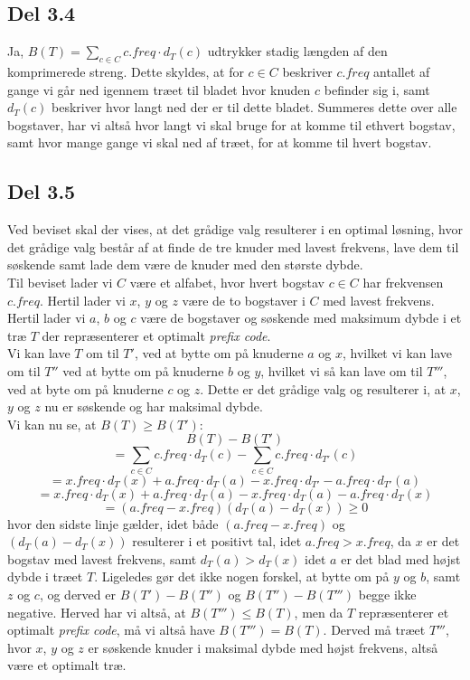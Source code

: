 \documentclass{report}
\begin{document}
\newpage

\subsection*{Del 3.4}
Ja, $B(T) = \sum_{c \in C} c.freq \cdot d_T(c)$ udtrykker stadig længden af den komprimerede streng. Dette skyldes, at for $c \in C$ beskriver $c.freq$ antallet af gange vi går ned igennem træet til bladet hvor knuden $c$ befinder sig i, samt $d_T(c)$ beskriver hvor langt ned der er til dette bladet. Summeres dette over alle bogstaver, har vi altså hvor langt vi skal bruge for at komme til ethvert bogstav, samt hvor mange gange vi skal ned af træet, for at komme til hvert bogstav.

\newpage

\subsection*{Del 3.5}
Ved beviset skal der vises, at det grådige valg resulterer i en optimal løsning, hvor det grådige valg består af at finde de tre knuder med lavest frekvens, lave dem til søskende samt lade dem være de knuder med den største dybde. \\
Til beviset lader vi $C$ være et alfabet, hvor hvert bogstav $c \in C$ har frekvensen $c.freq$. Hertil lader vi $x$, $y$ og $z$ være de to bogstaver i $C$ med lavest frekvens. Hertil lader vi $a$, $b$ og $c$ være de bogstaver og søskende med maksimum dybde i et træ $T$ der repræsenterer et optimalt \textit{prefix code}. \\
Vi kan lave $T$ om til $T'$, ved at bytte om på knuderne $a$ og $x$, hvilket vi kan lave om til $T''$ ved at bytte om på knuderne $b$ og $y$, hvilket vi så kan lave om til $T'''$, ved at byte om på knuderne $c$ og $z$. Dette er det grådige valg og resulterer i, at $x$, $y$ og $z$ nu er søskende og har maksimal dybde. \\
Vi kan nu se, at $B(T) \geq B(T')$:
$$B(T) - B(T')$$
$$= \sum_{c \in C} c.freq \cdot d_T(c) - \sum_{c \in C} c.freq \cdot d_{T'} (c)$$
$$= x.freq \cdot d_T(x) + a.freq \cdot d_T(a) - x.freq \cdot d_{T'} - a.freq \cdot d_{T'}(a)$$
$$= x.freq \cdot d_T(x) + a.freq \cdot d_T(a) - x.freq \cdot d_T(a) - a.freq \cdot d_T(x)$$
$$= (a.freq - x.freq)(d_T(a) - d_T(x)) \geq 0$$
hvor den sidste linje gælder, idet både $(a.freq - x.freq)$ og $(d_T(a) - d_T(x))$ resulterer i et positivt tal, idet $a.freq > x.freq$, da $x$ er det bogstav med lavest frekvens, samt $d_T(a) > d_T(x)$ idet $a$ er det blad med højst dybde i træet $T$. Ligeledes gør det ikke nogen forskel, at bytte om på $y$ og $b$, samt $z$ og $c$, og derved er $B(T') - B(T'')$ og $B(T'') - B(T''')$ begge ikke negative. Herved har vi altså, at $B(T''') \leq B(T)$, men da $T$ repræsenterer et optimalt \textit{prefix code}, må vi altså have $B(T''') = B(T)$. Derved må træet $T'''$, hvor $x$, $y$ og $z$ er søskende knuder i maksimal dybde med højst frekvens, altså være et optimalt træ.
\end{document}

